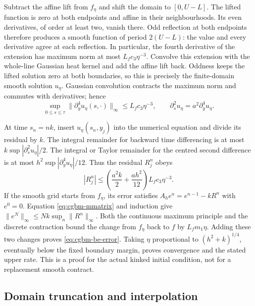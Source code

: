 \documentclass[11pt]{article}
\begin{document}
Subtract the affine lift from $f_\eta$ and shift the domain to
$[0,U-L]$. The lifted function is zero at both endpoints and affine in
their neighbourhoods. Its even derivatives, of order at least two,
vanish there. Odd reflection at both endpoints therefore produces a
smooth function of period $2(U-L)$: the value and every derivative agree
at each reflection. In particular, the fourth derivative of the extension
has maximum norm at most $L_f c_3\eta^{-3}$. Convolve this extension with
the whole-line Gaussian heat kernel and add the affine lift back. Oddness
keeps the lifted solution zero at both boundaries, so this is precisely
the finite-domain smooth solution $u_\eta$. Gaussian convolution contracts
the maximum norm and commutes with derivatives; hence
\begin{equation}
 \sup_{0\leq s\leq\tau}\|\partial_y^4u_\eta(s,\cdot)\|_\infty
 \leq L_f c_3\eta^{-3},\qquad
 \partial_s^2u_\eta=a^2\partial_y^4u_\eta.
 \label{eq:cgbm-smooth-regularity}
\end{equation}

At time $s_n=nk$, insert $u_\eta(s_n,y_j)$ into the numerical equation
and divide its residual by $k$. The integral remainder for backward
time differencing is at most
$k\sup|\partial_s^2u_\eta|/2$. The integral or Taylor remainder for the
centred second difference is at most
$h^2\sup|\partial_y^4u_\eta|/12$. Thus the residual $R_j^n$ obeys
\begin{equation}
 |R_j^n|\leq
 \left(\frac{a^2k}{2}+\frac{ah^2}{12}\right)L_f c_3\eta^{-3}.
 \label{eq:cgbm-residual}
\end{equation}
If the smooth grid starts from $f_\eta$, its error satisfies
$A_h e^n=e^{n-1}-kR^n$ with $e^0=0$. Equation
\eqref{eq:cgbm-mmatrix} and induction give
$\|e^N\|_\infty\leq Nk\sup_n\|R^n\|_\infty$.
Both the continuous maximum principle and the discrete contraction bound
the change from $f_\eta$ back to $f$ by $L_fm_1\eta$. Adding these two
changes proves \eqref{eq:cgbm-be-error}. Taking
$\eta$ proportional to $(h^2+k)^{1/4}$, eventually below the fixed boundary
margin, proves convergence and the stated upper rate. This is a proof
for the actual kinked initial condition, not for a replacement smooth
contract.

\subsection{Domain truncation and interpolation}
\end{document}
